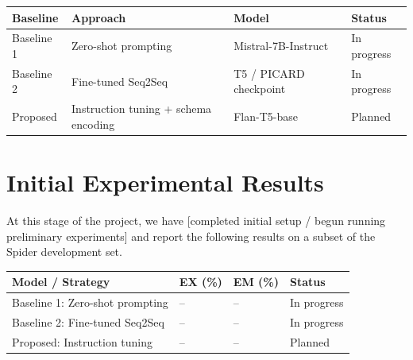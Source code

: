 \documentclass[11pt,a4paper]{article}
\begin{document}
\begin{center}
\begin{tabular}{llll}
  \toprule
  \textbf{Baseline} & \textbf{Approach} & \textbf{Model} & \textbf{Status} \\
  \midrule
  Baseline 1 & Zero-shot prompting & Mistral-7B-Instruct & In progress \\
  Baseline 2 & Fine-tuned Seq2Seq  & T5 / PICARD checkpoint & In progress \\
  Proposed   & Instruction tuning + schema encoding & Flan-T5-base & Planned \\
  \bottomrule
\end{tabular}
\end{center}


\section{Initial Experimental Results}


At this stage of the project, we have [completed initial setup / begun running
preliminary experiments] and report the following results on a subset of the
Spider development set.


\begin{center}
\begin{tabular}{llll}
  \toprule
  \textbf{Model / Strategy} & \textbf{EX (\%)} & \textbf{EM (\%)} & \textbf{Status} \\
  \midrule
  Baseline 1: Zero-shot prompting & – & – & In progress \\
  Baseline 2: Fine-tuned Seq2Seq  & – & – & In progress \\
  Proposed: Instruction tuning    & – & – & Planned \\
  \bottomrule
\end{tabular}
\end{center}
\end{document}
